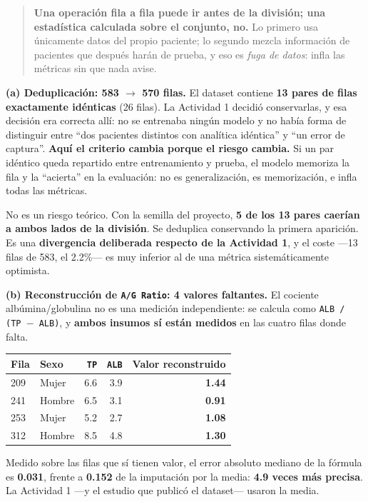 \documentclass[10pt,a4paper]{article}
\begin{document}
\begin{quote}
\textbf{Una operación fila a fila puede ir antes de la división; una estadística calculada sobre el conjunto, no.} Lo primero usa únicamente datos del propio paciente; lo segundo mezcla información de pacientes que después harán de prueba, y eso es \textit{fuga de datos}: infla las métricas sin que nada avise.
\end{quote}

\textbf{(a) Deduplicación: 583 $\rightarrow$ 570 filas.} El dataset contiene \textbf{13 pares de filas exactamente idénticas} (26 filas). La Actividad 1 decidió conservarlas, y esa decisión era correcta allí: no se entrenaba ningún modelo y no había forma de distinguir entre ``dos pacientes distintos con analítica idéntica'' y ``un error de captura''. \textbf{Aquí el criterio cambia porque el riesgo cambia.} Si un par idéntico queda repartido entre entrenamiento y prueba, el modelo memoriza la fila y la ``acierta'' en la evaluación: no es generalización, es memorización, e infla todas las métricas.

No es un riesgo teórico. Con la semilla del proyecto, \textbf{5 de los 13 pares caerían a ambos lados de la división}. Se deduplica conservando la primera aparición. Es una \textbf{divergencia deliberada respecto de la Actividad 1}, y el coste ---13 filas de 583, el 2.2\%--- es muy inferior al de una métrica sistemáticamente optimista.

\textbf{(b) Reconstrucción de \texttt{A/G Ratio}: 4 valores faltantes.} El cociente albúmina/globulina no es una medición independiente: se calcula como \texttt{ALB / (TP $-$ ALB)}, y \textbf{ambos insumos sí están medidos} en las cuatro filas donde falta.

\begin{table}[H]
\footnotesize
\centering
\begin{tabular}{@{}l l r r r@{}}
\toprule
\textbf{Fila} & \textbf{Sexo} & \textbf{\texttt{TP}} & \textbf{\texttt{ALB}} & \textbf{Valor reconstruido} \\
\midrule
209 & Mujer & 6.6 & 3.9 & \textbf{1.44} \\
241 & Hombre & 6.5 & 3.1 & \textbf{0.91} \\
253 & Mujer & 5.2 & 2.7 & \textbf{1.08} \\
312 & Hombre & 8.5 & 4.8 & \textbf{1.30} \\
\bottomrule
\end{tabular}
\end{table}

Medido sobre las filas que sí tienen valor, el error absoluto mediano de la fórmula es \textbf{0.031}, frente a \textbf{0.152} de la imputación por la media: \textbf{4.9 veces más precisa}. La Actividad 1 ---y el estudio que publicó el dataset--- usaron la media.
\end{document}
